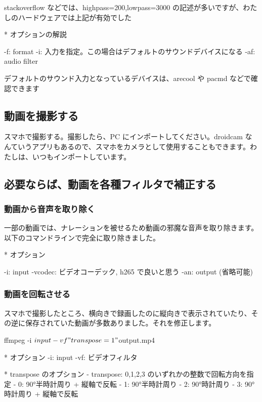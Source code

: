 \documentclass[mingoth,a4paper]{jsarticle}
\begin{document}
stackoverflow などでは、highpass=200,lowpass=3000 の記述が多いですが、わたしのハードウェアでは上記が有効でした

* オプションの解説
\begin{commandline}
  -f: format
  -i: 入力を指定。この場合はデフォルトのサウンドデバイスになる
  -af: audio filter
\end{commandline}

デフォルトのサウンド入力となっているデバイスは、arecool や pacmd などで確認できます

\subsection{動画を撮影する}
スマホで撮影する。撮影したら、PC にインポートしてください。droidcam なんていうアプリもあるので、スマホをカメラとして使用することもできます。わたしは、いつもインポートしています。

\subsection{必要ならば、動画を各種フィルタで補正する}

\subsubsection{動画から音声を取り除く}
一部の動画では、ナレーションを被せるため動画の邪魔な音声を取り除きます。以下のコマンドラインで完全に取り除きました。

* オプション
\begin{commandline}
  -i: input
  -vcodec: ビデオコーデック, h265 で良いと思う
  -an: output (省略可能)
\end{commandline}

\subsubsection{ 動画を回転させる}
スマホで撮影したところ、横向きで録画したのに縦向きで表示されていたり、その逆に保存されていた動画が多数ありました。それを修正します。
\begin{commandline}
ffmpeg -i ${input} -vf "transpose=1" ${output}.mp4
\end{commandline}

\begin{commandline}
* オプション
  -i: input
  -vf: ビデオフィルタ

* transpose のオプション
  - transpose: 0,1,2,3 のいずれかの整数で回転方向を指定
	  - 0: 90°半時計周り + 縦軸で反転
	  - 1: 90°半時計周り
	  - 2: 90°時計周り
	  - 3: 90°時計周り + 縦軸で反転
\end{commandline}
\end{document}
